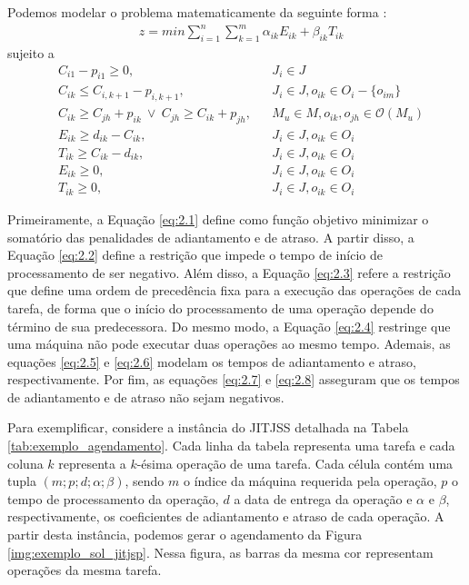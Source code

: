 Podemos modelar o problema matematicamente da seguinte forma \citep{baptiste2008lagrangian}:
\begin{align} \label{eq:2.1}
&z= min \sum^{n}_{i=1}\sum^{m}_{k=1} \alpha_{ik} E_{ik} + \beta_{ik} T_{ik}
\end{align}
sujeito a
\begin{align}
&C_{i1} - p_{i1} \geq 0, &&J_i \in J \label{eq:2.2} \\
&C_{ik} \leq C_{i,k+1} - p_{i,k+1}, &&J_i \in J, o_{ik} \in O_i - \{o_{im}\} \label{eq:2.3} \\
&C_{ik} \geq C_{jh} + p_{ik}  \ \lor \   C_{jh} \geq C_{ik} + p_{jh}, &&M_u \in M, o_{ik},o_{jh} \in \mathscr{O}(M_u) \label{eq:2.4} \\
&E_{ik} \geq d_{ik} - C_{ik}, && J_i \in J, o_{ik} \in O_i \label{eq:2.5} \\
&T_{ik} \geq C_{ik} - d_{ik}, && J_i \in J, o_{ik} \in O_i \label{eq:2.6} \\
&E_{ik} \geq 0, && J_i \in J, o_{ik} \in O_i \label{eq:2.7} \\
&T_{ik} \geq 0, && J_i \in J, o_{ik} \in O_i \label{eq:2.8}
\end{align}

Primeiramente, a Equação \ref{eq:2.1} define como função objetivo minimizar o somatório das penalidades de adiantamento e de atraso. A partir disso, a Equação \ref{eq:2.2} define a restrição que impede o tempo de início de processamento de ser negativo. Além disso, a Equação \ref{eq:2.3} refere a restrição que define uma ordem de precedência fixa para a execução das operações de cada tarefa, de forma que o início do processamento de uma operação depende do término de sua predecessora. Do mesmo modo, a Equação \ref{eq:2.4} restringe que uma máquina não pode executar duas operações ao mesmo tempo. Ademais, as equações \ref{eq:2.5} e \ref{eq:2.6} modelam os tempos de adiantamento e atraso, respectivamente. Por fim, as equações \ref{eq:2.7} e \ref{eq:2.8} asseguram que os tempos de adiantamento e de atraso não sejam negativos.

Para exemplificar, considere a instância do \ac{JITJSS} detalhada na Tabela \ref{tab:exemplo_agendamento}. Cada linha da tabela representa uma tarefa e cada coluna $k$ representa a $k$-ésima operação de uma tarefa. Cada célula contém uma tupla $(m; p; d; \alpha; \beta)$, sendo $m$ o índice da máquina requerida pela operação, $p$ o tempo de processamento da operação, $d$ a data de entrega da operação e $\alpha$ e $\beta$, respectivamente, os coeficientes de adiantamento e atraso de cada operação. A partir desta instância, podemos gerar o agendamento da Figura \ref{img:exemplo_sol_jitjsp}. Nessa figura, as barras da mesma cor representam operações da mesma tarefa.

